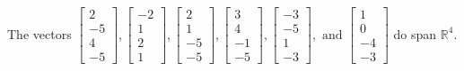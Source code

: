 \begin{exercise}
\begin{exerciseStatement}
  \end{exerciseStatement}
  \begin{exerciseAnswer}
   The vectors \(\left[\begin{array}{r}
2 \\
-5 \\
4 \\
-5
\end{array}\right] , \left[\begin{array}{r}
-2 \\
1 \\
2 \\
1
\end{array}\right] , \left[\begin{array}{r}
2 \\
1 \\
-5 \\
-5
\end{array}\right] , \left[\begin{array}{r}
3 \\
4 \\
-1 \\
-5
\end{array}\right] , \left[\begin{array}{r}
-3 \\
-5 \\
1 \\
-3
\end{array}\right] , \text{ and } \left[\begin{array}{r}
1 \\
0 \\
-4 \\
-3
\end{array}\right]\) 
  	 do  
	span \(\mathbb{R}^4\).
  


  \end{exerciseAnswer}
\end{exercise}